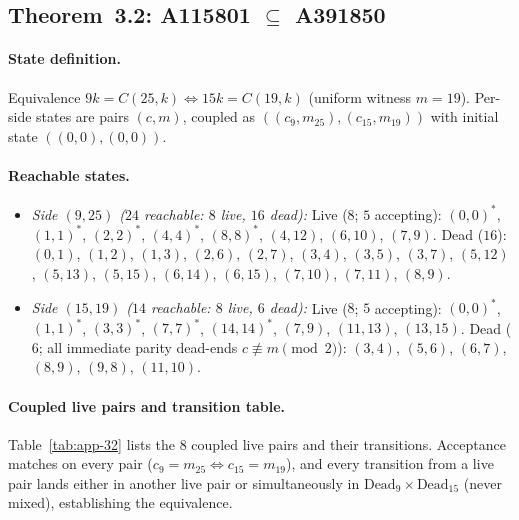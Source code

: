 \documentclass[11pt]{article}
\begin{document}
\subsection{Theorem~3.2: A115801 $\subseteq$ A391850}
\label{app:thm32}

\paragraph{State definition.}
Equivalence $9k = C(25,k) \iff 15k = C(19,k)$ (uniform witness $m = 19$). Per-side states are pairs $(c, m)$, coupled as $((c_9, m_{25}), (c_{15}, m_{19}))$ with initial state $((0,0),(0,0))$.

\paragraph{Reachable states.}
\begin{itemize}
  \item \emph{Side $(9,25)$ ($24$ reachable: $8$ live, $16$ dead):}
  Live ($8$; $5$ accepting): $(0,0)^*$, $(1,1)^*$, $(2,2)^*$, $(4,4)^*$, $(8,8)^*$, $(4,12)$, $(6,10)$, $(7,9)$.
  Dead ($16$): $(0,1)$, $(1,2)$, $(1,3)$, $(2,6)$, $(2,7)$, $(3,4)$, $(3,5)$, $(3,7)$, $(5,12)$, $(5,13)$, $(5,15)$, $(6,14)$, $(6,15)$, $(7,10)$, $(7,11)$, $(8,9)$.
  \item \emph{Side $(15,19)$ ($14$ reachable: $8$ live, $6$ dead):}
  Live ($8$; $5$ accepting): $(0,0)^*$, $(1,1)^*$, $(3,3)^*$, $(7,7)^*$, $(14,14)^*$, $(7,9)$, $(11,13)$, $(13,15)$.
  Dead ($6$; all immediate parity dead-ends $c \not\equiv m \pmod{2}$): $(3,4)$, $(5,6)$, $(6,7)$, $(8,9)$, $(9,8)$, $(11,10)$.
\end{itemize}

\paragraph{Coupled live pairs and transition table.}
Table~\ref{tab:app-32} lists the $8$ coupled live pairs and their transitions. Acceptance matches on every pair ($c_9 = m_{25} \iff c_{15} = m_{19}$), and every transition from a live pair lands either in another live pair or simultaneously in $\mathrm{Dead}_9 \times \mathrm{Dead}_{15}$ (never mixed), establishing the equivalence.
\end{document}
